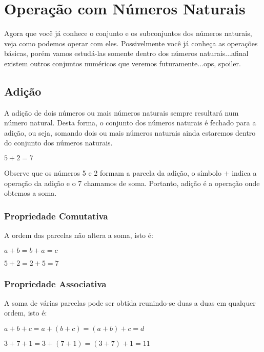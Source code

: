 \section{Operação com Números Naturais}
Agora que você já conhece o conjunto  e os subconjuntos dos números  naturais, veja como podemos operar com eles. Possivelmente você já conheça as operações básicas, porém vamos estudá-las somente dentro dos números naturais...afinal existem outros conjuntos numéricos que veremos futuramente...ops, spoiler.

\subsection{Adição}
A adição de dois números ou mais números naturais sempre resultará num número natural. Desta forma, o conjunto dos números naturais é fechado para a adição, ou seja, 
somando dois ou mais números naturais ainda estaremos dentro do conjunto dos números naturais.

\begin{example}
    $5+2=7$
\end{example}

Observe que os números 5 e 2 formam a parcela da adição, o símbolo $+$ indica a operação da adição e o 7 chamamos de soma. Portanto, adição é a operação onde obtemos a soma. 

\subsubsection{Propriedade Comutativa}
A ordem das parcelas não altera a soma, isto é:
\begin{center}
    $a+b=b+a=c$
\end{center}
\begin{example}
    $5+2=2+5=7$    
\end{example}


\subsubsection{Propriedade Associativa}
A soma de várias parcelas pode ser obtida reunindo-se duas a duas em qualquer ordem, isto é:
\begin{center}
    $a+b+c=a+(b+c)=(a+b)+c=d$
\end{center}

\begin{example}
    $3+7+1=3+(7+1)=(3+7)+1=11$  
\end{example}

